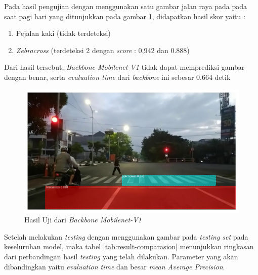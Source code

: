 Pada hasil pengujian dengan menggunakan satu gambar jalan raya pada pada saat pagi hari yang ditunjukkan pada gambar \ref{fig:hasil-mobilenetv1}, didapatkan hasil skor yaitu :
\begin{enumerate}[nolistsep]
	\item Pejalan kaki (tidak terdeteksi)
	\item \textit{Zebracross} (terdeteksi 2  dengan \textit{score} : 0,942 dan 0.888)
\end{enumerate}
Dari hasil tersebut, \textit{Backbone Mobilenet-V1} tidak dapat memprediksi gambar dengan benar, serta \textit{evaluation time} dari \textit{backbone} ini sebesar 0.664 detik
\begin{figure}[H] 
	\centering
	\includegraphics[scale=0.3]{gambar/fajar-frame800-mobilenetv1.png}
	\caption{Hasil Uji dari \textit{Backbone Mobilenet-V1}}
	\label{fig:hasil-mobilenetv1}
\end{figure}

Setelah melakukan \textit{testing} dengan menggunakan gambar pada \textit{testing set} pada keseluruhan model, maka tabel \ref{tab:result-comparasion} menunjukkan ringkasan dari perbandingan hasil \textit{testing} yang telah dilakukan. Parameter yang akan dibandingkan yaitu \textit{evaluation time} dan besar \textit{mean Average Precision}.

\begin{table}[H]
	\centering
	\caption{tabel Perbandingan Hasil \textit{Testing}}
	\label{tab:result-comparasion}
\end{table}

